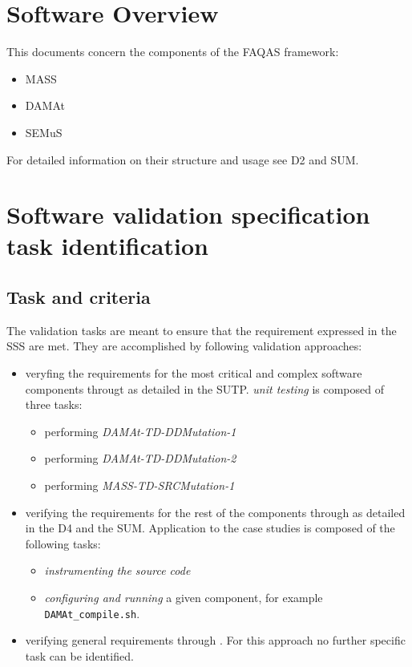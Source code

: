 \chapter{Software Overview}

This documents concern the components of the FAQAS framework:
\begin{itemize}
  \item MASS
  \item DAMAt
  \item SEMuS
\end{itemize}

For detailed information on their structure and usage see D2 and SUM.

\chapter{Software validation specification task identification}

\section{Task and criteria}
\label{sec:taskCrit}

The validation tasks are meant to ensure that the requirement expressed in the SSS are met.
They are accomplished by following validation approaches:
\begin{itemize}
  \item veryfing the requirements for the most critical and complex software components througt  as detailed in the SUTP.
  \emph{unit testing} is composed of three tasks:
  \begin{itemize}
    \item performing \emph{DAMAt-TD-DDMutation-1}
    \item performing \emph{DAMAt-TD-DDMutation-2}
    \item performing \emph{MASS-TD-SRCMutation-1}
  \end{itemize}
  \item verifying the requirements for the rest of the components through  as detailed in the D4 and the SUM.
  Application to the case studies is composed of the following tasks:
  \begin{itemize}
    \item \emph{instrumenting the source code}
    \item \emph{configuring and running} a given component, for example \texttt{DAMAt\_compile.sh}.
  \end{itemize}
  \item verifying general requirements through . For this approach no further specific task can be identified.
\end{itemize}

